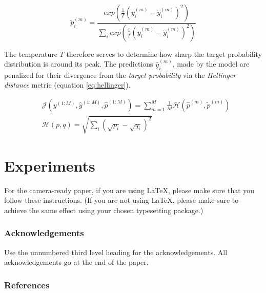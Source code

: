 \documentclass[twoside]{article}
\begin{document}
\begin{equation}\label{eq:targetprob}
\widetilde{p}_{i}^{(m)} = \frac{exp \left( \frac{1}{T} (y_{i}^{(m)} - \hat{y}_{i}^{(m)})^{2} \right)}{\sum_{i}{exp \left( \frac{1}{T} (y_{i}^{(m)} - \hat{y}_{i}^{(m)})^{2} \right)}} 
\end{equation}

The temperature $T$ therefore serves to determine how sharp the target probability distribution is around its peak. The predictions $\hat{y}^{(m)}_{i}$, made by the model are penalized for their divergence from the \emph{target probability} via the \emph{Hellinger distance} metric (equation \ref{eq:hellinger}).


\begin{align}\label{eq:hellinger}
& \mathcal{J}(y^{(1:M)}, \hat{y}^{(1:M)}, \hat{p}^{(1:M)}) = \sum_{m = 1}^{M}{\frac{1}{M} \mathcal{H}(\hat{p}^{(m)}, \widetilde{p}^{(m)})} \\
& \mathcal{H}(p, q) = \sqrt{\sum_{i}{(\sqrt{p_i} -  \sqrt{q_i})^2}}
\end{align}



\section{Experiments}

For the camera-ready paper, if you are using \LaTeX, please make sure
that you follow these instructions.  (If you are not using \LaTeX,
please make sure to achieve the same effect using your chosen
typesetting package.)


\subsubsection*{Acknowledgements}

Use the unnumbered third level heading for the acknowledgements.  All
acknowledgements go at the end of the paper.

\subsubsection*{References}


\end{document}
